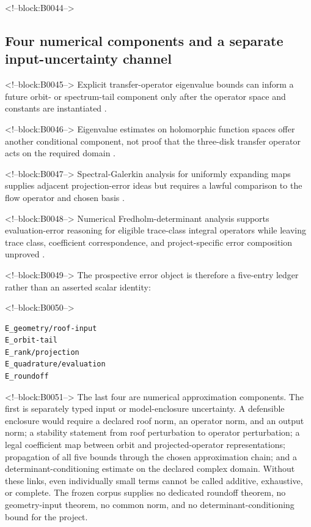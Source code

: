 \documentclass[11pt,a4paper]{article}
\begin{document}
<!--block:B0044-->
\subsection{Four numerical components and a separate input-uncertainty channel}

<!--block:B0045-->
Explicit transfer-operator eigenvalue bounds can inform a future orbit- or spectrum-tail component only after the operator space and constants are instantiated
\citep{P30-S19}.

<!--block:B0046-->
Eigenvalue estimates on holomorphic function spaces offer another conditional component, not proof that the three-disk transfer operator acts on the required domain
\citep{P30-S20}.

<!--block:B0047-->
Spectral-Galerkin analysis for uniformly expanding maps supplies adjacent projection-error ideas but requires a lawful comparison to the flow operator and chosen basis
\citep{P30-S21}.

<!--block:B0048-->
Numerical Fredholm-determinant analysis supports evaluation-error reasoning for eligible trace-class integral operators while leaving trace class, coefficient correspondence, and project-specific error composition unproved
\citep{P30-S22}.

<!--block:B0049-->
The prospective error object is therefore a five-entry ledger rather than an asserted scalar identity:

<!--block:B0050-->
\begin{verbatim}
E_geometry/roof-input
E_orbit-tail
E_rank/projection
E_quadrature/evaluation
E_roundoff
\end{verbatim}

<!--block:B0051-->
The last four are numerical approximation components. The first is separately typed input or model-enclosure uncertainty. A defensible enclosure would require a declared roof norm, an operator norm, and an output norm; a stability statement from roof perturbation to operator perturbation; a legal coefficient map between orbit and projected-operator representations; propagation of all five bounds through the chosen approximation chain; and a determinant-conditioning estimate on the declared complex domain. Without these links, even individually small terms cannot be called additive, exhaustive, or complete. The frozen corpus supplies no dedicated roundoff theorem, no geometry-input theorem, no common norm, and no determinant-conditioning bound for the project.
\end{document}
